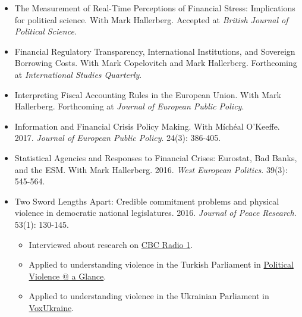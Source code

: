 \documentclass[a4paper]{article}
\begin{document}
\begin{itemize}

    \item The Measurement of Real-Time Perceptions of Financial Stress: Implications for political science. With Mark Hallerberg. Accepted at \emph{British Journal of Political Science}.

    \item Financial Regulatory Transparency, International Institutions, and Sovereign Borrowing Costs. With Mark Copelovitch and Mark Hallerberg. Forthcoming at \emph{International Studies Quarterly}.

    \item Interpreting Fiscal Accounting Rules in the European Union. With Mark Hallerberg. Forthcoming at \emph{Journal of European Public Policy}.

    \item Information and Financial Crisis Policy Making. With M\'{i}ch\'{e}al O'Keeffe. 2017. \emph{Journal of European Public Policy}. 24(3): 386-405.

    \item Statistical Agencies and Responses to Financial Crises: Eurostat, Bad Banks, and the ESM. With Mark Hallerberg. 2016. {\emph{West European Politics}}. 39(3): 545-564.

    \item Two Sword Lengths Apart: Credible commitment problems and physical violence in democratic national legislatures. 2016. \emph{Journal of Peace Research}. 53(1): 130-145.

        \begin{itemize}
            \item Interviewed about research on \href{http://www.cbc.ca/radio/day6/episode-286-parliamentary-brawls-transgender-rights-the-raptors-secret-weapon-migrant-ships-and-more-1.3591232/you-thought-elbowgate-was-bad-check-out-these-political-brawls-1.3591248}{CBC Radio 1}.

            \item Applied to understanding violence in the Turkish Parliament in \href{https://politicalviolenceataglance.org/2016/05/27/brawl-in-turkish-national-assembly-indicates-deeper-trouble/}{Political Violence @ a Glance}.

            \item Applied to understanding violence in the Ukrainian Parliament in \href{http://voxukraine.org/2015/12/24/causes-and-possible-solutions-to-brawling-in-the-ukrainian-parliament-en-2/}{VoxUkraine}.


\end{itemize}
\end{itemize}
\end{document}
